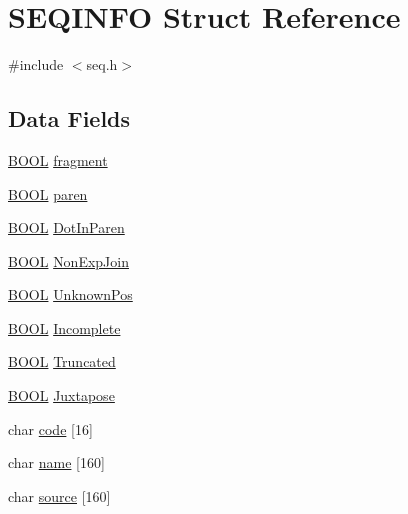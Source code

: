 \hypertarget{struct_s_e_q_i_n_f_o}{\section{S\-E\-Q\-I\-N\-F\-O Struct Reference}
\label{struct_s_e_q_i_n_f_o}
}


{\ttfamily \#include $<$seq.\-h$>$}

\subsection*{Data Fields}
\begin{DoxyCompactItemize}
\item 
\hyperlink{_sys_defs_8h_a2df9d82ef74025dde989a5ae3edc886c}{B\-O\-O\-L} \hyperlink{struct_s_e_q_i_n_f_o_a0d8893f1fb00461343fb0847294ef7e2}{fragment}
\item 
\hyperlink{_sys_defs_8h_a2df9d82ef74025dde989a5ae3edc886c}{B\-O\-O\-L} \hyperlink{struct_s_e_q_i_n_f_o_aa57615161b7717166daaa36586302c0c}{paren}
\item 
\hyperlink{_sys_defs_8h_a2df9d82ef74025dde989a5ae3edc886c}{B\-O\-O\-L} \hyperlink{struct_s_e_q_i_n_f_o_a98a16dc2b509517cc1bb5131d3e90a05}{Dot\-In\-Paren}
\item 
\hyperlink{_sys_defs_8h_a2df9d82ef74025dde989a5ae3edc886c}{B\-O\-O\-L} \hyperlink{struct_s_e_q_i_n_f_o_a8326c03098d6785baf216333744fac37}{Non\-Exp\-Join}
\item 
\hyperlink{_sys_defs_8h_a2df9d82ef74025dde989a5ae3edc886c}{B\-O\-O\-L} \hyperlink{struct_s_e_q_i_n_f_o_a1368f4aa930338adc7d35fb51215578c}{Unknown\-Pos}
\item 
\hyperlink{_sys_defs_8h_a2df9d82ef74025dde989a5ae3edc886c}{B\-O\-O\-L} \hyperlink{struct_s_e_q_i_n_f_o_aa7fc41044d8f4c5818020b2b9e67d059}{Incomplete}
\item 
\hyperlink{_sys_defs_8h_a2df9d82ef74025dde989a5ae3edc886c}{B\-O\-O\-L} \hyperlink{struct_s_e_q_i_n_f_o_a0e2af1ca77e3096edf3edfd9e6bf044e}{Truncated}
\item 
\hyperlink{_sys_defs_8h_a2df9d82ef74025dde989a5ae3edc886c}{B\-O\-O\-L} \hyperlink{struct_s_e_q_i_n_f_o_a0219338882bcb93b1e10e86ed799972d}{Juxtapose}
\item 
char \hyperlink{struct_s_e_q_i_n_f_o_aafca8a0e3be2e005f8cee62f75a48b3c}{code} \mbox{[}16\mbox{]}
\item 
char \hyperlink{struct_s_e_q_i_n_f_o_ad6aa4dabee2ee797b0250c38ebe01475}{name} \mbox{[}160\mbox{]}
\item 
char \hyperlink{struct_s_e_q_i_n_f_o_afd881c5e19c55c444144220d23cf7975}{source} \mbox{[}160\mbox{]}
\end{DoxyCompactItemize}


